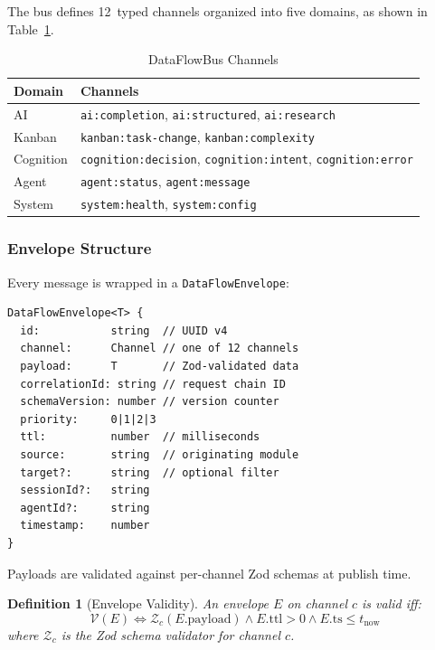 \documentclass[journal,10pt]{IEEEtran}
\newcommand{\code}[1]{\texttt{#1}}
\newtheorem{definition}{Definition}
\begin{document}
The bus defines 12~typed channels organized into five domains, as shown in Table~\ref{tab:channels}.

\begin{table}[!t]
\centering
\caption{DataFlowBus Channels}
\label{tab:channels}
\begin{tabular}{@{}lp{42mm}@{}}
\toprule
\textbf{Domain} & \textbf{Channels} \\
\midrule
AI        & \code{ai:completion}, \code{ai:structured}, \code{ai:research} \\
Kanban    & \code{kanban:task-change}, \code{kanban:complexity} \\
Cognition & \code{cognition:decision}, \code{cognition:intent}, \code{cognition:error} \\
Agent     & \code{agent:status}, \code{agent:message} \\
System    & \code{system:health}, \code{system:config} \\
\bottomrule
\end{tabular}
\end{table}

\subsubsection{Envelope Structure}

Every message is wrapped in a \code{DataFlowEnvelope}:

\begin{lstlisting}[language={}]
DataFlowEnvelope<T> {
  id:           string  // UUID v4
  channel:      Channel // one of 12 channels
  payload:      T       // Zod-validated data
  correlationId: string // request chain ID
  schemaVersion: number // version counter
  priority:     0|1|2|3
  ttl:          number  // milliseconds
  source:       string  // originating module
  target?:      string  // optional filter
  sessionId?:   string
  agentId?:     string
  timestamp:    number
}
\end{lstlisting}

Payloads are validated against per-channel Zod schemas at publish time.

\begin{definition}[Envelope Validity]
\label{def:envelope}
An envelope $E$ on channel $c$ is valid iff:
\begin{equation}
\mathcal{V}(E) \iff \mathcal{Z}_c(E.\text{payload}) \wedge E.\text{ttl} > 0 \wedge E.\text{ts} \leq t_{\text{now}}
\label{eq:validity}
\end{equation}
where $\mathcal{Z}_c$ is the Zod schema validator for channel $c$.
\end{definition}
\end{document}
